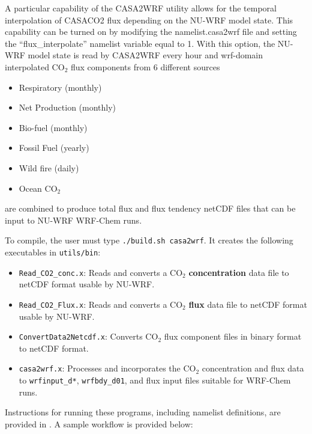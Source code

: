 A particular capability of the CASA2WRF utility allows for the temporal interpolation 
of CASACO2 flux depending on the NU-WRF model state. This capability can
be turned on by modifying the namelist.casa2wrf file and setting  the ``flux\_interpolate'' 
namelist variable equal to 1. With this option, the NU-WRF model state is read by 
CASA2WRF every hour and wrf-domain interpolated CO$_2$ flux components from 6 different sources
\begin{itemize}
\item Respiratory (monthly)
\item Net Production (monthly)
\item Bio-fuel (monthly)
\item Fossil Fuel (yearly)
\item Wild fire (daily) 
\item Ocean CO$_2$
\end{itemize}

are combined to produce total flux and flux tendency netCDF files that can be 
input to NU-WRF WRF-Chem runs. 

To compile, the user must type \texttt{./build.sh casa2wrf}. It creates the 
following executables in \texttt{utils/bin}:

\begin{itemize}

\item \texttt{Read\_CO2\_conc.x}: Reads and converts a CO$_2$ 
  \textbf{concentration} data file to netCDF format usable by NU-WRF.

\item \texttt{Read\_CO2\_Flux.x}: Reads and converts a CO$_2$ 
  \textbf{flux} data file to netCDF format usable by NU-WRF.
  
\item \texttt{ConvertData2Netcdf.x}: Converts CO$_2$ flux 
  component files in binary format to netCDF format.
  
\item \texttt{casa2wrf.x}: Processes and incorporates the CO$_2$ concentration and flux data
  to \texttt{wrfinput\_d*}, \texttt{wrfbdy\_d01}, and flux input files suitable for 
  WRF-Chem runs. 

\end{itemize}

Instructions for running these programs, including namelist definitions,
are provided in \cite{ref:Casa2WrfUserGuide}. A sample workflow is provided 
below:

